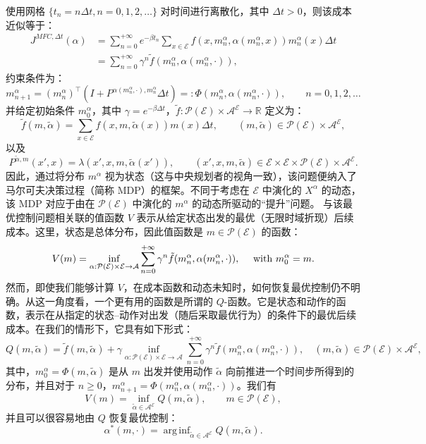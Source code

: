 \documentclass{amsproc}
\theoremstyle{definition}
\theoremstyle{remark}
\numberwithin{equation}{section}
\newcommand{\RR}{{\mathbb R}}
\newcommand{\cA}{{\mathcal A}}
\newcommand{\cE}{{\mathcal E}}
\newcommand{\cP}{{\mathcal P}}
\newcommand{\ctrl}{\alpha}
\DeclareMathOperator*{\arginf}{arg\,inf}
\begin{document}
使用网格 $\{t_n = n \Delta t, n = 0,1,2,\dots\}$ 对时间进行离散化，其中 $\Delta t>0$，则该成本近似等于：
\begin{align*}
	J^{MFC, \Delta t}(\ctrl) 
	&= \sum_{n=0}^{+\infty} e^{-\beta t_n} \sum_{x\in\cE} f(x, m^\ctrl_n, \ctrl(m^\ctrl_n,x) ) m^\ctrl_n(x) \Delta t 
	\\
	&=  \sum_{n=0}^{+\infty} \gamma^n \tilde f(m^\ctrl_n, \ctrl(m^\ctrl_n,\cdot)),
\end{align*}
约束条件为：
$$
	m^\ctrl_{n+1} 
	= (m^\ctrl_{n})^\top (I + P^{\ctrl(m^\ctrl_{n},\cdot), m^\ctrl_{n}} \Delta t)
	=: \Phi(m^\ctrl_{n}, \ctrl(m^\ctrl_{n},\cdot)), \qquad n = 0, 1, 2, \dots
$$
并给定初始条件 $m^\ctrl_0$，其中 $\gamma = e^{-\beta \Delta t}$，$\tilde f: \cP(\cE) \times \cA^{\cE} \to \RR$ 定义为：
$$
	\tilde f(m, \tilde\ctrl) = \sum_{x\in\cE} f(x, m, \tilde\ctrl(x) ) m(x) \Delta t, \qquad (m, \tilde\ctrl) \in \cP(\cE) \times \cA^\cE, 
$$
以及
$$
	P^{\tilde\ctrl, m}(x', x) = \lambda(x', x, m, \tilde\ctrl(x')), \qquad (x',x,m,\tilde\ctrl) \in \cE \times \cE \times \cP(\cE) \times \cA^\cE.
$$
因此，通过将分布 $m^\ctrl$ 视为状态（这与中央规划者的视角一致），该问题便纳入了马尔可夫决策过程（简称 MDP）的框架。不同于考虑在 $\cE$ 中演化的 $X^\ctrl$ 的动态，该 MDP 对应于由在 $\cP(\cE)$ 中演化的 $m^\ctrl$ 的动态所驱动的“提升”问题。  
与该最优控制问题相关联的值函数 $V$ 表示从给定状态出发的最优（无限时域折现）后续成本。这里，状态是总体分布，因此值函数是 $m \in \cP(\cE)$ 的函数：
$$
	V(m) = 
	\inf_{\ctrl : \cP(\cE) \times \cE \to \cA} \sum_{n=0}^{+\infty} \gamma^n \tilde f(m^\ctrl_n, \ctrl(m^\ctrl_n,\cdot)), \quad \hbox{ with } m^\ctrl_0 = m.
$$
 然而，即使我们能够计算 $V$，在成本函数和动态未知时，如何恢复最优控制仍不明确。从这一角度看，一个更有用的函数是所谓的 $Q$-函数。它是状态和动作的函数，表示在从指定的状态--动作对出发（随后采取最优行为）的条件下的最优后续成本。在我们的情形下，它具有如下形式： 
 $$
 	Q(m,\tilde\ctrl) = \tilde f(m,\tilde\ctrl) + \gamma \inf_{\ctrl : \cP(\cE) \times \cE \to \cA} \sum_{n=0}^{+\infty} \gamma^n \tilde f(m^\ctrl_n, \ctrl(m^\ctrl_n,\cdot)), \quad (m, \tilde\ctrl) \in \cP(\cE) \times \cA^{\cE},
 $$
 其中，$m^\ctrl_0 = \Phi(m, \tilde\ctrl)$ 是从 $m$ 出发并使用动作 $\tilde\ctrl$ 向前推进一个时间步所得到的分布，并且对于 $n \ge 0$，$m^\ctrl_{n+1} = \Phi(m^\ctrl_{n}, \ctrl(m^\ctrl_{n},\cdot))$。我们有
 \begin{equation}
 \label{eq:MFCQ-link-VQ}
 	V(m) = \inf_{\tilde\ctrl \in \cA^{\cE}} Q(m, \tilde\ctrl), \qquad m \in \cP(\cE),
 \end{equation}
并且可以很容易地由 $Q$ 恢复最优控制： 
\begin{equation}
 \label{eq:MFCQ-link-ctrloptQ}
 	\ctrl^*(m,\cdot) = \arginf_{\tilde\ctrl \in \cA^{\cE}} Q(m, \tilde\ctrl).
\end{equation}
\end{document}
